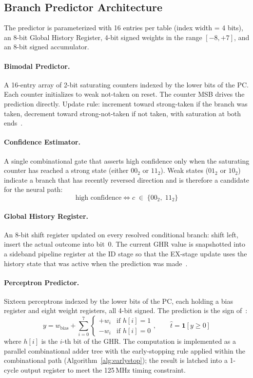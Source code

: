 \documentclass[12pt,a4paper]{article}
\begin{document}
\subsection{Branch Predictor Architecture}
\label{sec:bp-arch}

The predictor is parameterized with 16 entries per table (index width = 4 bits),
an 8-bit Global History Register, 4-bit signed weights in the range $[-8,+7]$,
and an 8-bit signed accumulator.

\paragraph{Bimodal Predictor.}
A 16-entry array of 2-bit saturating counters indexed by the lower bits of the
PC. Each counter initializes to weak not-taken on reset. The counter MSB drives
the prediction directly. Update rule: increment toward strong-taken if the branch
was taken, decrement toward strong-not-taken if not taken, with saturation at both
ends~\cite{smith1981study}.

\paragraph{Confidence Estimator.}
A single combinational gate that asserts high confidence only when the saturating
counter has reached a strong state (either $00_2$ or $11_2$). Weak states
($01_2$ or $10_2$) indicate a branch that has recently reversed direction and is
therefore a candidate for the neural path:
\[
  \text{high confidence} \iff c \;\in\; \{00_2,\; 11_2\}
\]

\paragraph{Global History Register.}
An 8-bit shift register updated on every resolved conditional branch: shift left,
insert the actual outcome into bit~0. The current GHR value is snapshotted into
a sideband pipeline register at the ID stage so that the EX-stage update uses
the history state that was active when the prediction was
made~\cite{yeh1991twolevel}.

\paragraph{Perceptron Predictor.}
Sixteen perceptrons indexed by the lower bits of the PC, each holding a bias
register and eight weight registers, all 4-bit signed. The prediction is the sign
of~\cite{jimenez2001perceptron}:
\[
  y = w_{\text{bias}} + \sum_{i=0}^{7}
      \begin{cases}
        +w_i & \text{if } h[i] = 1 \\
        -w_i & \text{if } h[i] = 0
      \end{cases}, \qquad
  \hat{t} = \mathbf{1}[y \geq 0]
\]
where $h[i]$ is the $i$-th bit of the GHR. The computation is implemented as a
parallel combinational adder tree with the early-stopping rule applied within
the combinational path (Algorithm~\ref{alg:earlystop}); the result is latched
into a 1-cycle output register to meet the 125\,MHz timing constraint.
\end{document}
